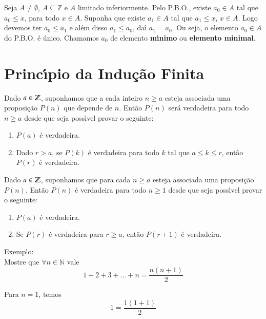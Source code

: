 Seja $A\neq\emptyset$, $A\subseteq\mathbb{Z}$ e $A$ limitado inferiormente. Pelo P.B.O., existe $a_{0}\in A$ tal que $a_{0}\leq x$, para todo $x\in A$. Suponha que existe $a_{1}\in A$ tal que $a_{1}\leq x$, $x\in A$. Logo devemos ter $a_{0}\leq a_{1}$ e al\'em disso $a_{1}\leq a_{0}$, da{\'\i} $a_{1}=a_{0}$. Ou seja, o elemento $a_{0}\in A$ do P.B.O. {\'e} {\'u}nico. Chamamos $a_{0}$ de elemento \textbf{m{\'\i}nimo} ou \textbf{elemento minimal}.

\section{Princ{\'\i}pio da Indu{\c c}{\~a}o Finita}

\begin{teorema}
Dado $a \in \mathbb{Z}$, suponhamos que a cada inteiro $n\geq a$ esteja associada uma proposi{\c c}{\~a}o $P(n)$ que depende de $n$. Ent{\~a}o $P(n)$ ser{\'a} verdadeira para todo $n\geq a$ desde que seja poss{\'\i}vel provar o seguinte:
\begin{enumerate}
\item $P(a)$ {\'e} verdadeira.
\item Dado $r > a$, se $P(k)$ {\'e} verdadeira para todo $k$ tal que $a \leq k\leq r$, ent{\~a}o $P(r)$ {\'e} verdadeira.
\end{enumerate}
\end{teorema}

\begin{teorema}
Dado $a \in \mathbb{Z}$, suponhamos que para cada $n\geq a$ esteja associada uma proposi{\c c}{\~a}o $P(n)$. Ent{\~a}o $P(n)$ {\'e} verdadeira para todo $n \geq 1$ desde que seja poss{\'\i}vel provar o seguinte:
\begin{enumerate}
\item $P(a)$ {\'e} verdadeira.
\item Se $P(r)$ {\'e} verdadeira para $r \geq a$, ent{\~a}o $P(r+1)$ {\'e} verdadeira.
\end{enumerate}
\end{teorema}

Exemplo:\\

Mostre que $\forall n\in\mathbb{N}$ vale \[1+2+3+...+n=\displaystyle\frac{n(n+1)}{2}\]

Para $n=1$, temos
\[1=\displaystyle\frac{1(1+1)}{2}\]

